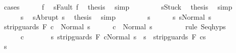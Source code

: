 \begin{isabellebody}
\ {\isacharparenleft}cases{\isacharparenright}\isanewline
\ \ \ \ \isamarkupfalse%
\ f\ \isamarkupfalse%
\ {\isachardoublequoteopen}s{\isacharequal}Fault\ f{\isachardoublequoteclose}\ \isamarkupfalse%
\ {\isacharquery}thesis\ \isamarkupfalse%
\ simp\isanewline
\ \ \isamarkupfalse%
\isanewline
\ \ \ \ \isamarkupfalse%
\ {\isachardoublequoteopen}s{\isacharequal}Stuck{\isachardoublequoteclose}\ \isamarkupfalse%
\ {\isacharquery}thesis\ \isamarkupfalse%
\ simp\isanewline
\ \ \isamarkupfalse%
\isanewline
\ \ \ \ \isamarkupfalse%
\ s{\isacharprime}\ \isamarkupfalse%
\ {\isachardoublequoteopen}s{\isacharequal}Abrupt\ s{\isacharprime}{\isachardoublequoteclose}\ \isamarkupfalse%
\ {\isacharquery}thesis\ \isamarkupfalse%
\ simp\isanewline
\ \ \isamarkupfalse%
\isanewline
\ \ \ \ \isamarkupfalse%
\ s{\isacharprime}\isanewline
\ \ \ \ \isamarkupfalse%
\ s{\isacharcolon}\ {\isachardoublequoteopen}s{\isacharequal}Normal\ s{\isacharprime}{\isachardoublequoteclose}\isanewline
\ \ \ \ \isamarkupfalse%
\ {\isachardoublequoteopen}{\isasymGamma}{\isasymturnstile}strip{\isacharunderscore}guards\ F\ c{}\ {\isasymdown}\ Normal\ s{\isacharprime}{\isachardoublequoteclose}\isanewline
\ \ \ \ \isamarkupfalse%
\ {\isachardoublequoteopen}{\isasymGamma}{\isasymturnstile}c{}\ {\isasymdown}\ Normal\ s{\isacharprime}{\isachardoublequoteclose}\ \isanewline
\ \ \ \ \ \ \isamarkupfalse%
\ {\isacharparenleft}rule\ Seq{\isachardot}hyps{\isacharparenright}\isanewline
\ \ \ \ \isamarkupfalse%
\isanewline
\ \ \ \ \isamarkupfalse%
\ c{}{\isacharcolon}\ \isanewline
\ \ \ \ \ \ {\isachardoublequoteopen}{\isasymforall}s{\isacharprime}{\isacharprime}{\isachardot}\ {\isasymGamma}{\isasymturnstile}{\isasymlangle}strip{\isacharunderscore}guards\ F\ c{}{\isacharcomma}Normal\ s{\isacharprime}{\isasymrangle}\ {\isasymRightarrow}\ s{\isacharprime}{\isacharprime}\ {\isasymlongrightarrow}\ {\isasymGamma}{\isasymturnstile}strip{\isacharunderscore}guards\ F\ c{}{\isasymdown}s{\isacharprime}{\isacharprime}{\isachardoublequoteclose}\isanewline
\ \ \ \ \isacommand{{\isacharbraceleft}}\isamarkupfalse%
\isanewline
\ \ \ \ \ \ \isamarkupfalse%
\ s{\isacharprime}{\isacharprime}\ \isamarkupfalse%

\end{isabellebody}
